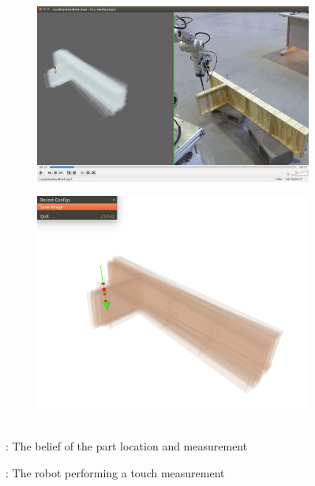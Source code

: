 \documentclass[../thesis.tex]{subfiles}
\begin{document}
\begin{figure}
\centering
    \begin{subfigure}[b]{.5\linewidth}
      \includegraphics[width=\linewidth, clip, trim=9in 3in 0in 1in]{./Introduction/Overview2}
        \caption{}
        \label{fig:Rigid:Overview_1}
    \end{subfigure}
    \hfill
    \begin{subfigure}[b]{.5\linewidth}
      \includegraphics[width=\linewidth, clip, trim=1.5in 1.5in 1.5in 1.3in]{./Introduction/Particle_Intersection}
        \caption{}
        \label{fig:Rigid:Overview_2}
    \end{subfigure}
\caption{: The robot performing a touch measurement}\\
: The belief of the part location and measurement
\label{fig:Rigid:Overview}
\end{figure}
\end{document}

